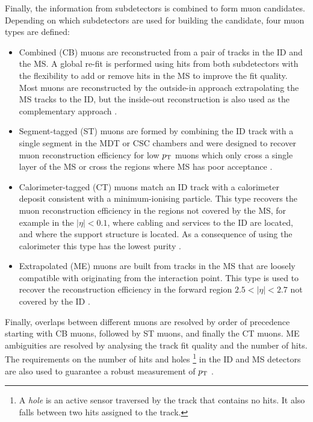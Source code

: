 Finally, the information from subdetectors is combined to form muon
candidates. Depending on which subdetectors are used for building the
candidate, four muon types are defined:
\begin{itemize}
\item Combined (CB) muons are reconstructed from a pair of tracks
in the ID and the MS. A global re-fit is performed using hits from 
both subdetectors with the flexibility to add or remove hits in the
MS to improve the fit quality. Most muons are reconstructed by the
outside-in approach extrapolating the MS tracks to the ID, but the
inside-out reconstruction is also used as the complementary approach 
\cite{Aad:2016jkr}.
\item Segment-tagged (ST) muons are formed by combining the ID track
with a single segment in the MDT or CSC chambers and were designed
to recover muon reconstruction efficiency for low $p_{\text{T}}$ muons which
only cross a single layer of the MS or cross the regions where
MS has poor acceptance \cite{Aad:2016jkr}.
\item Calorimeter-tagged (CT) muons match an ID track with a 
calorimeter deposit consistent with a minimum-ionising particle.
This type recovers the muon reconstruction efficiency in the regions
not covered by the MS, for example in the $|\eta|<0.1$, where cabling
and services to the ID are located, and where the support structure
is located. As a consequence of using the calorimeter this type has
the lowest purity \cite{Aad:2016jkr}.
\item Extrapolated (ME) muons are built from tracks in the MS that
are loosely compatible with originating from the interaction point.
This type is used to recover the reconstruction efficiency in the 
forward region $2.5 < |\eta| < 2.7$ not covered by the ID \cite{Aad:2016jkr}.
\end{itemize}
Finally, overlaps between different muons are resolved by order of
precedence starting with CB muons, followed by ST muons, and
finally the CT muons. ME ambiguities are resolved by analysing the
track fit quality and the number of hits.
The requirements on the number of hits and holes
\footnote{A \textit{hole} is an active sensor traversed by the
track that contains no hits. It also falls between two hits assigned to the track.}
in the ID and MS detectors are also used to guarantee a robust
measurement of $p_{\text{T}}$ \cite{Aad:2016jkr}.

